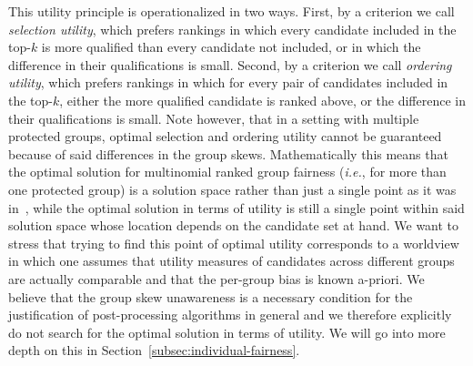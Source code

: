 This utility principle is operationalized in two ways.
%
First, by a criterion we call \emph{selection utility}, which prefers rankings in which every candidate included in the top-$k$ is more qualified than every candidate not included, or in which the difference in their qualifications is small.
%
Second, by a criterion we call \emph{ordering utility}, which prefers rankings in which for every pair of candidates included in the top-$k$, either the more qualified candidate is ranked above, or the difference in their qualifications is small.
%
Note however, that in a setting with multiple protected groups, optimal selection and ordering utility cannot be guaranteed because of said differences in the group skews.
%
Mathematically this means that the optimal solution for multinomial ranked group fairness ({\em i.e.}, for more than one protected group) is a solution space rather than just a single point as it was in~\cite{zehlike2017fair}, while the optimal solution in terms of utility is still a single point within said solution space whose location depends on the candidate set at hand.
%
We want to stress that trying to find this point of optimal utility corresponds to a worldview in which one assumes that utility measures of candidates across different groups are actually comparable and that the per-group bias is known a-priori.
%
We believe that the group skew unawareness is a necessary condition for the justification of post-processing algorithms in general and we therefore explicitly do not search for the optimal solution in terms of utility.
%
We will go into more depth on this in Section~\ref{subsec:individual-fairness}.
%

